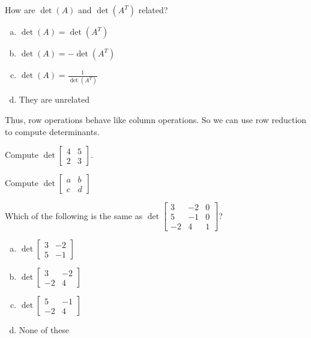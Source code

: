 
\begin{applicationActivities}{2}{26}

\begin{activity}{0}
  How are $\det(A)$ and $\det(A^T)$ related?
\begin{enumerate}[(a)]
\item $\det(A)=\det(A^T)$
\item $\det(A)=-\det(A^T)$
\item $\det(A)=\frac{1}{\det(A^T)}$
\item They are unrelated
\end{enumerate}
\end{activity}

\begin{observation}
  Thus, row operations behave like column operations.  So we can use row reduction to compute determinants.
\end{observation}

\begin{activity}{0}
  Compute $\det \begin{bmatrix} 4 & 5 \\ 2 & 3 \end{bmatrix}$.
\end{activity}

\begin{activity}{0}
  Compute $\det \begin{bmatrix} a & b \\ c & d \end{bmatrix}$
\end{activity}

\begin{activity}{0}
  Which of the following is the same as $\det \begin{bmatrix} 3 & -2 & 0 \\  5 & -1 & 0 \\  -2 & 4 & 1\end{bmatrix}$?
\begin{enumerate}[(a)]
\item $\det \begin{bmatrix} 3 & -2 \\ 5 & -1 \end{bmatrix}$
\item $\det \begin{bmatrix} 3 & -2 \\ -2 & 4 \end{bmatrix}$
\item $\det \begin{bmatrix} 5 & -1 \\ -2 & 4 \end{bmatrix}$
\item None of these
\end{enumerate}
\end{activity}


\end{applicationActivities}
